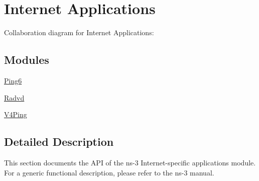 \hypertarget{group__internet-apps}{}\section{Internet Applications}
\label{group__internet-apps}
Collaboration diagram for Internet Applications\+:
\subsection*{Modules}
\begin{DoxyCompactItemize}
\item 
\hyperlink{group__ping6}{Ping6}
\item 
\hyperlink{group__radvd}{Radvd}
\item 
\hyperlink{group__v4ping}{V4\+Ping}
\end{DoxyCompactItemize}


\subsection{Detailed Description}
This section documents the A\+PI of the ns-\/3 Internet-\/specific applications module. For a generic functional description, please refer to the ns-\/3 manual. 